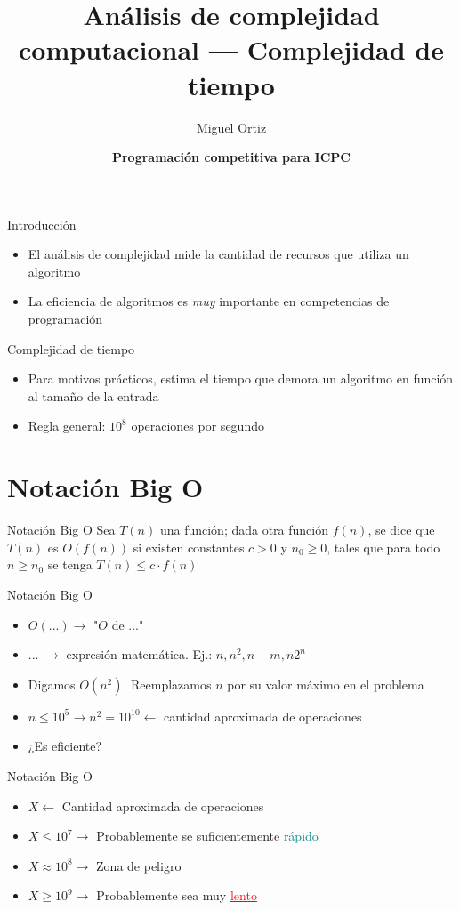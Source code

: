 \documentclass[10pt]{beamer}
\title{Análisis de complejidad computacional --- Complejidad de tiempo}
\author{Miguel Ortiz}
\institute{Octubre 2023}
\date{\textbf{Programación competitiva para ICPC}}
\newcommand{\bi}{\begin{itemize}}
\newcommand{\ei}{\end{itemize}}
\begin{document}
\maketitle

\begin{frame}{Introducción}
    \bi
        \item El análisis de complejidad mide la cantidad de recursos que utiliza un algoritmo
        \item La eficiencia de algoritmos es \textit{muy} importante en competencias de programación
    \ei
\end{frame}

\begin{frame}{Complejidad de tiempo}
    \bi
        \item Para motivos prácticos, estima el tiempo que demora un algoritmo en función al tamaño de la entrada
        \item Regla general: $10^8$ operaciones por segundo
    \ei
\end{frame}

\section{Notación Big O}

\begin{frame}{Notación Big O}
    Sea $T(n)$ una función; dada otra función $f(n)$, se dice que $T(n)$ es 
    $O(f(n))$ si existen constantes $c > 0$ y $n_0 \geq 0$, tales que para todo $n \geq n_0$ 
    se tenga $T(n) \leq c \cdot f(n)$
\end{frame}

\begin{frame}{Notación Big O}
  \bi
    \item $O(...) \rightarrow$ "$O$ de ..." 
    \item ... $\rightarrow$ expresión matemática. Ej.: $n, n^2, n+m, n2^n$
    \item <2-> Digamos $O(n^2)$. Reemplazamos $n$ por su valor máximo en el problema
    \item <2-> $n \leq 10^5 \rightarrow n^2 = \boxed{10^{10}} \leftarrow$ cantidad aproximada de operaciones 
    \item <3-> ¿Es eficiente?
  \ei
\end{frame}

\begin{frame}{Notación Big O}
  \bi
    \item $X \leftarrow$ Cantidad aproximada de operaciones
    \vspace{10pt}
    \item $X \leq 10^7 \rightarrow$ Probablemente se suficientemente \textcolor{teal}{\underline{rápido}}
    \vspace{10pt}
    \item $X \approx 10^8 \rightarrow$ Zona de peligro
    \vspace{10pt}
    \item $X \geq 10^9 \rightarrow$ Probablemente sea muy \textcolor{red}{\underline{lento}}
  \ei
\end{frame}
\end{document}
